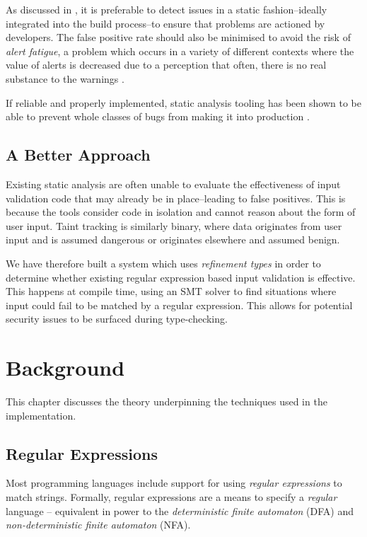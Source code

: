 \documentclass[a4paper,openany,12pt]{book}
\begin{document}
As discussed in \citet{sadowski2018lessons}, it is preferable to detect issues in a static fashion--ideally integrated into the build process--to ensure that problems are actioned by developers. The false positive rate should also be minimised to avoid the risk of \emph{alert fatigue}, a problem which occurs in a variety of different contexts where the value of alerts is decreased due to a perception that often, there is no real substance to the warnings \citep{kesselheim2011clinical}.

If reliable and properly implemented, static analysis tooling has been shown to be able to prevent whole classes of bugs from making it into production \citep{sadowski2018lessons}.

\section{A Better Approach}

Existing static analysis are often unable to evaluate the effectiveness of input validation code that may already be in place--leading to false positives. This is because the tools consider code in isolation and cannot reason about the form of user input. Taint tracking is similarly binary, where data originates from user input and is assumed dangerous or originates elsewhere and assumed benign.

We have therefore built a system which uses \emph{refinement types} in order to determine whether existing regular expression based input validation is effective. This happens at compile time, using an SMT solver to find situations where input could fail to be matched by a regular expression. This allows for potential security issues to be surfaced during type-checking.

\chapter{Background}
This chapter discusses the theory underpinning the techniques used in the implementation.


\section{Regular Expressions}

Most programming languages include support for using \emph{regular expressions} to match strings. Formally, regular expressions are a means to specify a \emph{regular} language -- equivalent in power to the \emph{deterministic finite automaton} (DFA) and \emph{non-deterministic finite automaton} (NFA).
\end{document}
